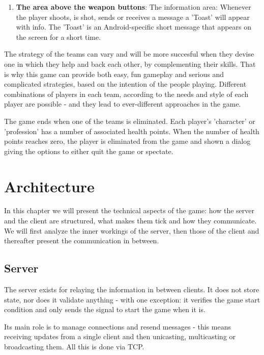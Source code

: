 \documentclass{article}
\begin{document}
\begin{enumerate}
  \item \textbf{The area above the weapon buttons}: The information area:
  Whenever the player shoots, is shot, sends or receives a message a 'Toast'
  will appear with info. The 'Toast' is an Android-specific short message that
  appears on the screen for a short time.
  
\end{enumerate}

The strategy of the teams can vary and will be more succesful when they devise
one in which they help and back each other, by complementing their skills. That
is why this game can provide both easy, fun gameplay and serious and complicated
strategies, based on the intention of the people playing. Different combinations
of players in each team, according to the needs and style of each player are
possible - and they lead to ever-different approaches in the game.\newline

The game ends when one of the teams is eliminated. Each player's 'character' or
'profession' has a number of associated health points. When the number of health
points reaches zero, the player is eliminated from the game and shown a dialog
giving the options to either quit the game or spectate.\newline


\section{Architecture}

In this chapter we will present the technical aspects of the game: how the
server and the client are structured, what makes them tick and how they
communicate. We will first analyze the inner workings of the server, then those
of the client and thereafter present the communication in between.\newline

\subsection{Server}


The server exists for relaying the information in between clients. It does not
store state, nor does it validate anything - with one exception: it verifies the
game start condition and only sends the signal to start the game when it
is.\newline

Its main role is to manage connections and resend messages - this means
receiving updates from a single client and then unicasting, multicasting or
broadcasting them. All this is done via TCP.\newline
\end{document}
